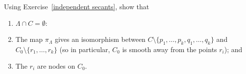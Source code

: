 \begin{exercise}\label{construction of nodal curves}
Using Exercise~\ref{independent secants}, show that 
\begin{enumerate}
\item $\Lambda \cap C = \emptyset$:
\item The map $\pi_\Lambda$ gives an isomorphism between $C \setminus \{p_1,\dots,p_k, q_1,\dots, q_k\}$ and $C_0 \setminus \{r_1,\dots,r_k\}$ (so in particular, $C_0$ is smooth away from the points $r_i$); and
\item The $r_i$ are nodes on $C_0$.
\end{enumerate}
\end{exercise}

\begin{exercise}\label{secant general position}
 
\end{exercise}
%


